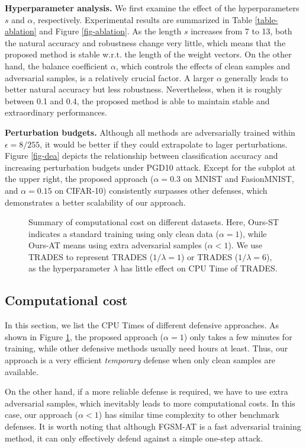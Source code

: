 \documentclass[preprint,review,12pt]{elsarticle}
\numberwithin{equation}{section}
\begin{document}
\textbf{Hyperparameter analysis.} We first examine the effect of the hyperparameters $s$ and $\alpha$, respectively.
Experimental results are summarized in Table \ref{table-ablation} and Figure \ref{fig-ablation}.
As the length $s$ increases from 7 to 13,
both the natural accuracy and robustness change very little,
which means that the proposed method is stable w.r.t. the length of the weight vectors.
On the other hand, the balance coefficient $\alpha$,  which controls the effects of clean samples and adversarial samples, is a relatively crucial factor.
A larger $\alpha$ generally leads to better natural accuracy but less robustness.
Nevertheless, when it is roughly between 0.1 and 0.4,
the proposed method is able to maintain stable and extraordinary performances.

\textbf{Perturbation budgets.}
Although all methods are adversarially trained within $\epsilon = 8 / 255$,
it would be better if they could extrapolate to lager perturbations.
Figure \ref{fig-dea} depicts the relationship between classification accuracy and increasing perturbation budgets under PGD10 attack.
Except for the subplot at the upper right,
the proposed approach ($\alpha=0.3 $ on MNIST and FasionMNIST, and $\alpha=0.15 $ on CIFAR-10) consistently surpasses other defenses,
which demonstrates a better scalability of our approach.

\begin{figure}[htb]
	\centering
	\caption{Summary of computational cost on different datasets.
    Here, Ours-ST indicates a standard training using only clean data ($ \alpha =1 $),
	while Ours-AT  means using extra adversarial samples  ($ \alpha <1 $).
    We use TRADES to represent TRADES ($1/\lambda=1$) or TRADES ($1/\lambda=6$),
	as the hyperparameter $\lambda$ has little effect on CPU Time of TRADES.	
	}
	\label{fig-cputime}
\end{figure}

\subsection{Computational cost}
In this section, we list the CPU Times of different defensive approaches.
As shown in Figure \ref{fig-cputime},
the proposed approach ($\alpha=1$) only takes a few minutes for training,
while other defensive methods usually need hours at least.
Thus, our approach is a very efficient \textit{temporary} defense when only clean samples are available.

On the other hand, if a more reliable defense is required,
we have to use extra adversarial samples, which inevitably leads to more computational costs.
In this case, our approach  ($\alpha<1$) has similar time complexity to other benchmark defenses.
It is worth noting that although FGSM-AT is a fast adversarial training method,
 it can only effectively defend against a simple one-step attack.
\end{document}
